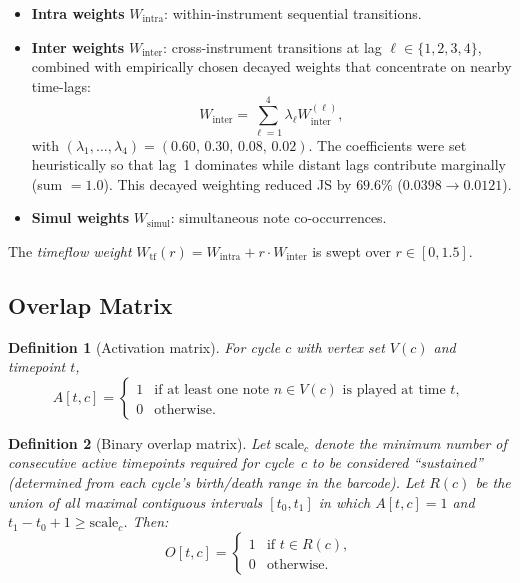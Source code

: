 \documentclass[conference,10pt,a4paper]{IEEEtran}
\newtheorem{definition}{Definition}
\begin{document}
\begin{itemize}[nosep]
\item \textbf{Intra weights} $W_{\mathrm{intra}}$: within-instrument
      sequential transitions.
\item \textbf{Inter weights} $W_{\mathrm{inter}}$: cross-instrument
      transitions at lag $\ell \in \{1,2,3,4\}$, combined with
      empirically chosen decayed weights that concentrate on nearby
      time-lags:
\begin{equation}
W_{\mathrm{inter}} = \sum_{\ell=1}^{4} \lambda_\ell W_{\mathrm{inter}}^{(\ell)},
\end{equation}
with $(\lambda_1,\ldots,\lambda_4) = (0.60,\, 0.30,\, 0.08,\, 0.02)$.
      The coefficients were set heuristically so that lag~1 dominates
      while distant lags contribute marginally (sum $= 1.0$).
      This decayed weighting reduced JS by $69.6\%$ ($0.0398 \to 0.0121$).
\item \textbf{Simul weights} $W_{\mathrm{simul}}$: simultaneous
      note co-occurrences.
\end{itemize}

The \emph{timeflow weight} $W_{\mathrm{tf}}(r) = W_{\mathrm{intra}} + r \cdot W_{\mathrm{inter}}$ is swept over $r \in [0, 1.5]$.

\subsection{Overlap Matrix}
\label{subsec:overlap}

\begin{definition}[Activation matrix]
For cycle $c$ with vertex set $V(c)$ and timepoint $t$,
\[
A[t,c] =
\begin{cases}
1 & \text{if at least one note } n \in V(c) \text{ is played at time } t,\\
0 & \text{otherwise.}
\end{cases}
\]
\end{definition}

\begin{definition}[Binary overlap matrix]
Let $\mathrm{scale}_c$ denote the minimum number of consecutive
active timepoints required for cycle~$c$ to be considered ``sustained''
(determined from each cycle's birth/death range in the barcode).
Let $R(c)$ be the union of all maximal contiguous intervals
$[t_0, t_1]$ in which $A[t,c] = 1$ and $t_1 - t_0 + 1 \ge \mathrm{scale}_c$.
Then:
\[
O[t,c] =
\begin{cases}
1 & \text{if } t \in R(c),\\
0 & \text{otherwise.}
\end{cases}
\]
\end{definition}
\end{document}
